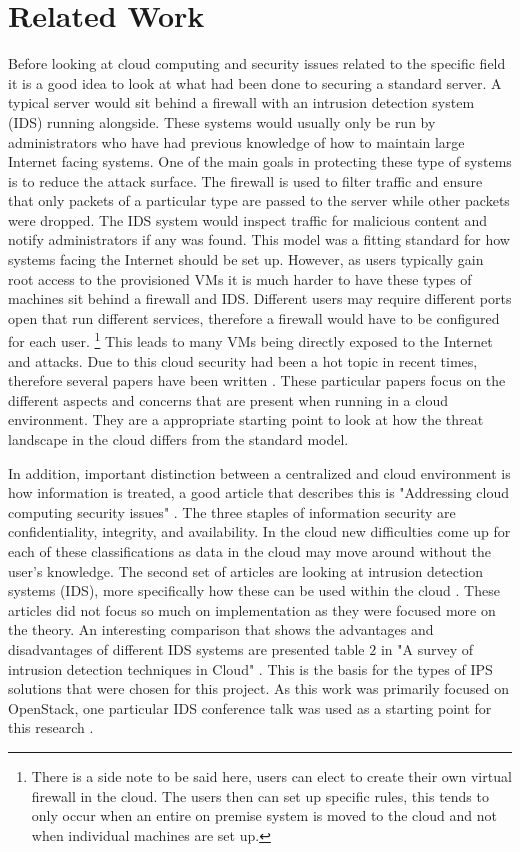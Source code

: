 \documentclass[12pt]{article}
\begin{document}
\section{Related Work}
Before looking at cloud computing and security issues related to the specific field it is a good idea to look at what had been done to securing a standard server. A typical server would sit behind a firewall with an intrusion detection system (IDS) \cite{DigitalOcianServerSecurity} running alongside.  These systems would usually only be run by administrators who have had previous knowledge of how to maintain large Internet facing systems. One of the main goals in protecting these type of systems is to reduce the attack surface. The firewall is used to filter traffic and ensure that only packets of a particular type are passed to the server while other packets were dropped. The IDS system would inspect traffic for malicious content and notify administrators if any was found. This model was a fitting standard for how systems facing the Internet should be set up. However, as users typically gain root access to the provisioned VMs it is much harder to have these types of machines sit behind a firewall and IDS. Different users may require different ports open that run different services, therefore a firewall would have to be configured for each user. \footnote{There is a side note to be said here, users can elect to create their own virtual firewall in the cloud. The users then can set up specific rules, this tends to only occur when an entire on premise system is moved to the cloud and not when individual machines are set up.} This leads to many VMs being directly exposed to the Internet and attacks. Due to this cloud security had been a hot topic in recent times, therefore several papers have been written \cite{zissis2012addressing, mishra2013cloud, krutz2010cloud}. These particular papers focus on the different aspects and concerns that are present when running in a cloud environment. They are a appropriate starting point to look at how the threat landscape in the cloud differs from the standard model.

In addition, important distinction between a centralized and cloud environment is how information is treated, a good article that describes this is "Addressing cloud computing security issues" \cite{zissis2012addressing}. The three staples of information security are confidentiality, integrity, and availability. In the cloud new difficulties come up for each of these classifications as data in the cloud may move around without the user's knowledge.  The second set of articles are looking at intrusion detection systems (IDS), more specifically how these can be used within the cloud \cite{SurveyOfIDS, patel2013intrusion}. These articles did not focus so much on implementation as they were focused more on the theory. An interesting comparison that shows the advantages and disadvantages of different IDS systems are presented table $2$ in "A survey of intrusion detection techniques in Cloud" \cite{SurveyOfIDS}. This is the basis for the types of IPS solutions that were chosen for this project. As this work was primarily focused on OpenStack, one particular IDS conference talk was used as a starting point for this research \cite{videoPresentation}.
\end{document}
